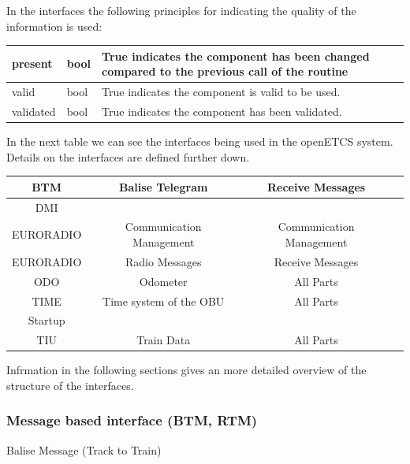 \documentclass{template/openetcs_report}
\begin{document}
In the interfaces the following principles for indicating the quality of the information is used:


\begin{supertabular}{| p{2 cm} | p{2 cm} | p{8 cm} |}
present & bool & True indicates the component has been changed compared to the previous call of the routine
\\\hline 
valid & bool & True indicates the component is valid to be used. 
\\\hline 
validated & bool & True indicates the component has been validated.
\\\hline 
\end{supertabular}

In the next table we can see the interfaces being used in the openETCS system. Details on the interfaces are defined further down.

\begin{supertabular}{| c | c | c  | c |}
\gls{BTM} & Balise Telegram & Receive Messages & \\\hline
\gls{DMI} & & \\\hline
EURORADIO & Communication Management & Communication Management & \\\hline
EURORADIO & Radio Messages & Receive Messages & \\\hline
\gls{ODO} & Odometer & All Parts & \\\hline
TIME & Time system of the OBU & All Parts & \\\hline
Startup \\\hline
TIU & Train Data & All Parts & \\\hline
\end{supertabular}

Infrmation in the following sections gives an more detailed overview of the structure of the interfaces.


\subsubsection{Message based interface (BTM, RTM)}


Balise Message (Track to Train)\\
\end{document}
